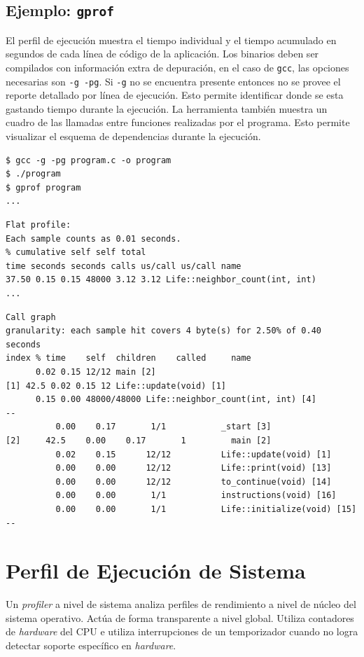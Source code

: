 \documentclass[a4paper]{report}
\begin{document}
\subsection{Ejemplo: {\tt gprof}}

El perfil de ejecución muestra el tiempo individual y el tiempo acumulado en segundos de cada línea de código de la aplicación. Los binarios deben ser compilados con información extra de depuración, en el caso de {\tt gcc}, las opciones necesarias son {\tt -g -pg}. Si {\tt -g} no se encuentra presente entonces no se provee el reporte detallado por línea de ejecución. Esto permite identificar donde se esta gastando tiempo durante la ejecución.
La herramienta también muestra un cuadro de las llamadas entre funciones realizadas por el programa.
Esto permite visualizar el esquema de dependencias durante la ejecución.

\begin{lstlisting} 
$ gcc -g -pg program.c -o program
$ ./program
$ gprof program
...
\end{lstlisting}

\begin{lstlisting} 
Flat profile:
Each sample counts as 0.01 seconds.
% cumulative self self total
time seconds seconds calls us/call us/call name
37.50 0.15 0.15 48000 3.12 3.12 Life::neighbor_count(int, int)
...
\end{lstlisting}

\begin{lstlisting} 
Call graph
granularity: each sample hit covers 4 byte(s) for 2.50% of 0.40 seconds
index % time    self  children    called     name
      0.02 0.15 12/12 main [2]
[1] 42.5 0.02 0.15 12 Life::update(void) [1]
      0.15 0.00 48000/48000 Life::neighbor_count(int, int) [4]
--
          0.00    0.17       1/1           _start [3]
[2]     42.5    0.00    0.17       1         main [2]
          0.02    0.15      12/12          Life::update(void) [1]
          0.00    0.00      12/12          Life::print(void) [13]
          0.00    0.00      12/12          to_continue(void) [14]
          0.00    0.00       1/1           instructions(void) [16]
          0.00    0.00       1/1           Life::initialize(void) [15]
--
\end{lstlisting}

\section{Perfil de Ejecución de Sistema}

Un {\it profiler} a nivel de sistema analiza perfiles de rendimiento a nivel de núcleo del
sistema operativo. Actúa de forma transparente a nivel global. Utiliza
contadores de {\it hardware} del CPU e utiliza interrupciones de un temporizador
cuando no logra detectar soporte específico en {\it hardware}.
\end{document}
